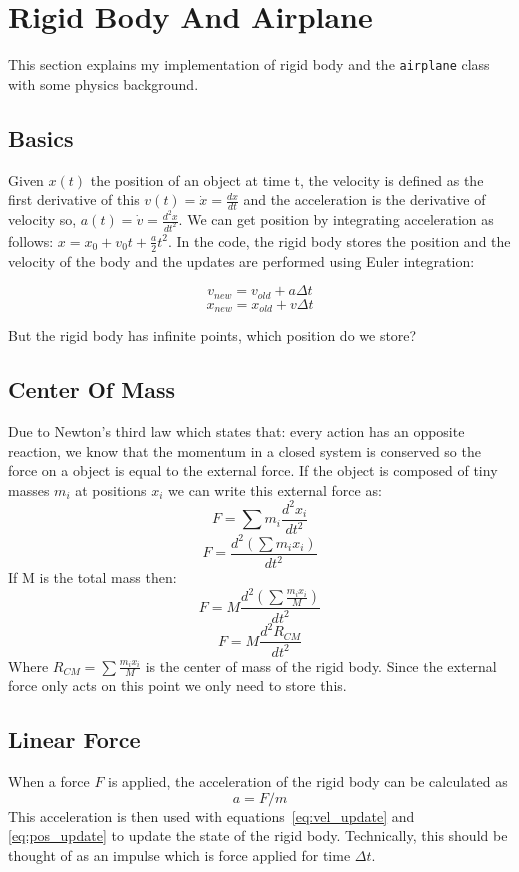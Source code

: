 \section{Rigid Body And Airplane}
This section explains my implementation of rigid body and the \texttt{airplane} class with some physics background.

\subsection{Basics}
Given $x(t)$ the position of an object at time t, the velocity is defined as the first derivative of this $v(t) = \dot{x} = \frac{dx}{dt}$ and the acceleration is the derivative of velocity so, $a(t) = \dot{v} = \frac{d^2x}{dt^2}$. We can get position by integrating acceleration as follows: $x = x_0 + v_0t + \frac{a}{2}t^2$. In the code, the rigid body stores the position and the velocity of the body and the updates are performed using Euler integration:

\begin{equation}
\label{eq:vel_update}
v_{new} = v_{old} + a\Delta{t}
\end{equation}
\begin{equation}
\label{eq:pos_update}
x_{new} = x_{old} + v\Delta{t}
\end{equation}

But the rigid body has infinite points, which position do we store?

\subsection{Center Of Mass}
Due to Newton's third law which states that: every action has an opposite reaction, we know that the momentum in a closed system is conserved so the force on a object is equal to the external force. If the object is composed of tiny masses $m_i$ at positions $x_i$ we can write this external force as:
\[
F = \sum{m_i\frac{d^2x_i}{dt^2}}
\]
\[
F = \frac{d^2(\sum{m_ix_i})}{dt^2}
\]
If M is the total mass then:
\[
F = M\frac{d^2(\sum{\frac{m_ix_i}{M}})}{dt^2}
\]
\[
F = M\frac{d^2R_{CM}}{dt^2}
\]
Where $R_{CM} = \sum{\frac{m_ix_i}{M}}$ is the center of mass of the rigid body. Since the external force only acts on this point we only need to store this.

\subsection{Linear Force}
When a force $F$ is applied, the acceleration of the rigid body can be calculated as 
\[
a = F/m
\]
This acceleration is then used with equations~\ref{eq:vel_update} and \ref{eq:pos_update} to update the state of the rigid body. Technically, this should be thought of as an impulse which is force applied for time $\Delta t$.

